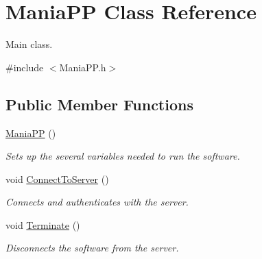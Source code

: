 \hypertarget{classManiaPP}{\section{Mania\-P\-P Class Reference}
\label{classManiaPP}
}


Main class.  




{\ttfamily \#include $<$Mania\-P\-P.\-h$>$}

\subsection*{Public Member Functions}
\begin{DoxyCompactItemize}
\item 
\hyperlink{classManiaPP_ae56f6623dc89f2c0b75bec631cfc2d19}{Mania\-P\-P} ()
\begin{DoxyCompactList}\small\item\em Sets up the several variables needed to run the software. \end{DoxyCompactList}\item 
void \hyperlink{classManiaPP_adb62da8dda48cf573666e82e6ecb8572}{Connect\-To\-Server} ()
\begin{DoxyCompactList}\small\item\em Connects and authenticates with the server. \end{DoxyCompactList}\item 
void \hyperlink{classManiaPP_a87fd53fffe4a1840834a90ab575f5ce6}{Terminate} ()
\begin{DoxyCompactList}\small\item\em Disconnects the software from the server. \end{DoxyCompactList}\end{DoxyCompactItemize}
